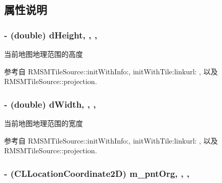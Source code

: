\subsection{属性说明}
\hypertarget{interface_r_m_s_m_layer_info_af25c14ce763ab15bff3a1fa972f336bb}{
\subsubsection[{d\-Height}]{\setlength{\rightskip}{0pt plus 5cm}-\/ (double) d\-Height\hspace{0.3cm}{\ttfamily [read]}, {\ttfamily [write]}, {\ttfamily [atomic]}, {\ttfamily [assign]}}}\label{interface_r_m_s_m_layer_info_af25c14ce763ab15bff3a1fa972f336bb}


当前地图地理范围的高度 



参考自 R\-M\-S\-M\-Tile\-Source\-::init\-With\-Info\-:, init\-With\-Tile\-:linkurl\-: , 以及 R\-M\-S\-M\-Tile\-Source\-::projection.

\hypertarget{interface_r_m_s_m_layer_info_a13807ccd8a6c9fbae7b6871c50e866cf}{
\subsubsection[{d\-Width}]{\setlength{\rightskip}{0pt plus 5cm}-\/ (double) d\-Width\hspace{0.3cm}{\ttfamily [read]}, {\ttfamily [write]}, {\ttfamily [atomic]}, {\ttfamily [assign]}}}\label{interface_r_m_s_m_layer_info_a13807ccd8a6c9fbae7b6871c50e866cf}


当前地图地理范围的宽度 



参考自 R\-M\-S\-M\-Tile\-Source\-::init\-With\-Info\-:, init\-With\-Tile\-:linkurl\-: , 以及 R\-M\-S\-M\-Tile\-Source\-::projection.

\hypertarget{interface_r_m_s_m_layer_info_ae5ab0f196f3230eb4799999fcf91a006}{
\subsubsection[{m\-\_\-pnt\-Org}]{\setlength{\rightskip}{0pt plus 5cm}-\/ (C\-L\-Location\-Coordinate2\-D) m\-\_\-pnt\-Org\hspace{0.3cm}{\ttfamily [read]}, {\ttfamily [write]}, {\ttfamily [atomic]}, {\ttfamily [assign]}}}\label{interface_r_m_s_m_layer_info_ae5ab0f196f3230eb4799999fcf91a006}


